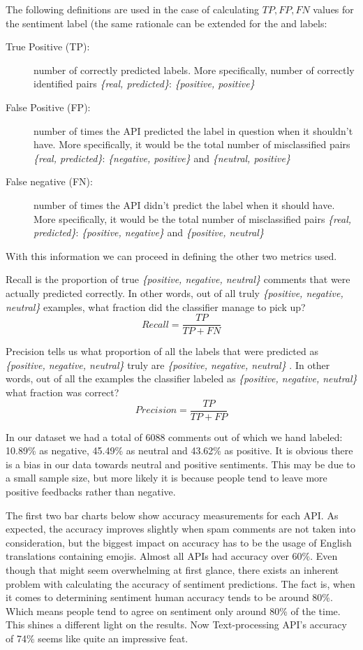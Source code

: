 \noindent The following definitions are used in the case of calculating $TP,FP,FN$ values for the  sentiment label (the same rationale can be extended for the  and  labels:
\begin{description}
 \item[True Positive (TP):] 
 number of correctly predicted labels. 
 More specifically, number of correctly identified pairs 
 \textit{\{real, predicted\}}: \textit{\{positive, positive\}}

 \item[False Positive (FP):]  
 number of times the API predicted the label in question when it shouldn't have.
 More specifically, it would be the total number of misclassified pairs 
 \textit{\{real, predicted\}}: \textit{\{negative, positive\}} and \textit{\{neutral, positive\}}

 \item[False negative (FN):] 
 number of times the API didn't predict the label when it should have. 
 More specifically, it would be the total number of misclassified pairs 
 \textit{\{real, predicted\}}: \textit{\{positive, negative\}} and \textit{\{positive, neutral\}}
\end{description}

With this information we can proceed in defining the other two metrics used.

Recall is the proportion of true \textit{\{positive, negative, neutral\}} comments that were actually predicted correctly. In other words, out of all truly \textit{\{positive, negative, neutral\}} examples, what fraction did the classifier manage to pick up?
\[Recall = \frac{TP}{TP + FN }\]


Precision tells us what proportion of all the labels that were predicted as \textit{\{positive, negative, neutral\}} truly are \textit{\{positive, negative, neutral\}} . In other words, out of all the examples the classifier labeled as \textit{\{positive, negative, neutral\}} what fraction was correct?
\[Precision = \frac{TP}{TP + FP }\]

In our dataset we had a total of 6088 comments out of which we hand labeled: 
10.89\% as negative, 45.49\% as neutral and 43.62\% as positive. 
It is obvious there is a bias in our data towards neutral and positive sentiments. 
This may be due to a small sample size, but more likely it is because people tend to leave more positive feedbacks rather than negative. 

The first two bar charts below show accuracy measurements for each API.
As expected, the accuracy improves slightly when spam comments are not taken into consideration, but the biggest impact on accuracy has to be the usage of English translations containing emojis.
Almost all APIs had accuracy over 60\%.
Even though that might seem overwhelming at first glance, there exists an inherent problem with calculating the accuracy of sentiment predictions. 
The fact is, when it comes to determining sentiment human accuracy tends to be around 80\%. Which means people tend to agree on sentiment only around 80\% of the time\cite{80PercentAccuracy}. 
This shines a different light on the results. 
Now Text-processing API's accuracy of 74\% seems like quite an impressive feat.

